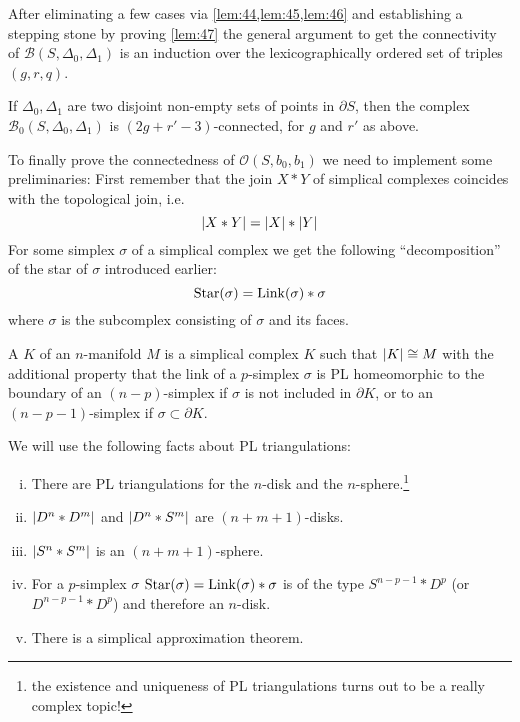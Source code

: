 After eliminating a few cases via \cref{lem:44,lem:45,lem:46} and establishing a stepping stone by proving \cref{lem:47} the general argument to get the connectivity of $\mathcal{B}(S,\Delta_0,\Delta_1)$ is an induction over the lexicographically ordered set of triples $(g,r,q)$.

\begin{theorem}[label=thm:48]
	If $\Delta_0, \Delta_1$ are two disjoint non-empty sets of points in $\partial S$, then the complex $\mathcal{B}_0(S,\Delta_0,\Delta_1)$ is $(2g+r'-3)$-connected, for $g$ and $r'$ as above.
\end{theorem}

To finally prove the connectedness of $\mathcal{O}(S,b_0,b_1)$ we need to implement some preliminaries:
First remember that the join $X * Y$ of simplical complexes coincides with the topological join, i.e.
\[
	\abs*{X * Y} = \abs*{X} * \abs*{Y}   
\]
For some simplex $\sigma$ of a simplical complex we get the following \enquote{decomposition} of the star of $\sigma$ introduced earlier:
\[
	\Star(\sigma) = \Link(\sigma) * \sigma
\]
where $\sigma$ is the subcomplex consisting of $\sigma$ and its faces.

\begin{definition*}
	A  $K$ of an $n$-manifold $M$ is a simplical complex $K$ such that $\abs*{K} \cong M$ with the additional property that the link of a $p$-simplex $\sigma$ is PL homeomorphic to the boundary of an $(n-p)$-simplex if $\sigma$ is not included in $\partial K$, or to an $(n-p-1)$-simplex if $\sigma \subset \partial K$.
\end{definition*}

We will use the following facts about PL triangulations:
\begin{enumerate}[(i),itemsep=0pt]
	\item There are PL triangulations for the $n$-disk and the $n$-sphere.\footnote{the existence and uniqueness of PL triangulations turns out to be a really complex topic!}
	\item $\abs*{D^n * D^m}$ and $\abs*{D^n * S^m}$ are $(n+m+1)$-disks.
	\item $\abs*{S^n * S^m}$ is an $(n+m+1)$-sphere.
	\item For a $p$-simplex $\sigma$ $\Star(\sigma) = \Link(\sigma) * \sigma$ is of the type $S^{n-p-1} * D^p$ (or $D^{n-p-1} * D^p$) and therefore an $n$-disk. 
	\item There is a simplical approximation theorem.
\end{enumerate}

